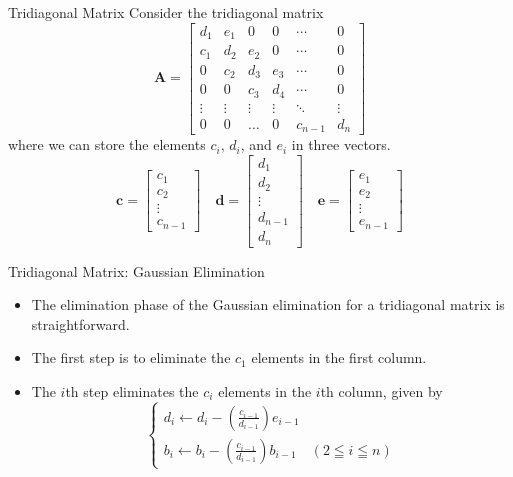 \documentclass{beamer}
\begin{document}
\begin{frame}{Tridiagonal  Matrix}
 Consider the tridiagonal matrix 
$$
\mathbf{A}=\left[\begin{array}{cccccc}
d_1 & e_1 & 0 & 0 & \cdots & 0 \\
c_1 & d_2 & e_2 & 0 & \cdots & 0 \\
0 & c_2 & d_3 & e_3 & \cdots & 0 \\
0 & 0 & c_3 & d_4 & \cdots & 0 \\
\vdots & \vdots & \vdots & \vdots & \ddots & \vdots \\
0 & 0 & \ldots & 0 & c_{n-1} & d_n
\end{array}\right]
$$
where we can store the elements $c_i$, $d_i$, and $e_i$ in three vectors.
$$
\mathbf{c}=\left[\begin{array}{c}
c_1 \\
c_2 \\
\vdots \\
c_{n-1}
\end{array}\right] \quad \mathbf{d}=\left[\begin{array}{c}
d_1 \\
d_2 \\
\vdots \\
d_{n-1} \\
d_n
\end{array}\right] \quad \mathbf{e}=\left[\begin{array}{c}
e_1 \\
e_2 \\
\vdots \\
e_{n-1}
\end{array}\right]
$$
 
\end{frame}
\begin{frame}{Tridiagonal  Matrix: Gaussian Elimination}
\begin{itemize}
\item The elimination phase of the Gaussian elimination for a tridiagonal matrix is straightforward.
\item The first step is to eliminate the $c_1$ elements in the first column.
\item The $i$th step eliminates the $c_i$ elements in the $i$th column, given by
$$
\left\{\begin{array}{l}
d_i \leftarrow d_i-\left(\frac{c_{i-1}}{d_{i-1}}\right) e_{i-1} \\
b_i \leftarrow b_i-\left(\frac{c_{i-1}}{d_{i-1}}\right) b_{i-1} \quad(2 \leqq i \leqq n)
\end{array}\right.
$$
\end{itemize}
\end{frame}
\end{document}
